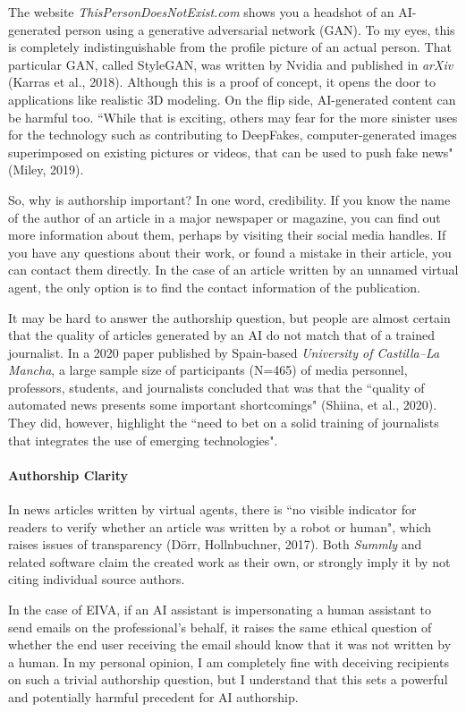 \documentclass{article}
\begin{document}
The website \emph{ThisPersonDoesNotExist.com} shows you a headshot of an AI-generated person using a generative adversarial network (GAN). To my eyes, this is completely indistinguishable from the profile picture of an actual person. That particular GAN, called StyleGAN, was written by Nvidia and published in \emph{arXiv} (Karras et al., 2018). Although this is a proof of concept, it opens the door to applications like realistic 3D modeling. On the flip side, AI-generated content can be harmful too. ``While that is exciting, others may fear for the more sinister uses for the technology such as contributing to DeepFakes, computer-generated images superimposed on existing pictures or videos, that can be used to push fake news" (Miley, 2019).

So, why is authorship important? In one word, credibility. If you know the name of the author of an article in a major newspaper or magazine, you can find out more information about them, perhaps by visiting their social media handles. If you have any questions about their work, or found a mistake in their article, you can contact them directly. In the case of an article written by an unnamed virtual agent, the only option is to find the contact information of the publication.

It may be hard to answer the authorship question, but people are almost certain that the quality of articles generated by an AI do not match that of a trained journalist. In a 2020 paper published by Spain-based \emph{University of Castilla–La Mancha}, a large sample size of participants (N=465) of media personnel, professors, students, and journalists concluded that was that the ``quality of automated news presents some important shortcomings" (Shiina, et al., 2020). They did, however, highlight the ``need to bet on a solid training of journalists that integrates the use of emerging technologies".

\paragraph{Authorship Clarity}

In news articles written by virtual agents, there is ``no visible indicator for readers to verify whether an article was written by a robot or human", which raises issues of transparency (Dörr, Hollnbuchner, 2017). Both \emph{Summly} and related software claim the created work as their own, or strongly imply it by not citing individual source authors.

In the case of EIVA, if an AI assistant is impersonating a human assistant to send emails on the professional's behalf, it raises the same ethical question of whether the end user receiving the email should know that it was not written by a human. In my personal opinion, I am completely fine with deceiving recipients on such a trivial authorship question, but I understand that this sets a powerful and potentially harmful precedent for AI authorship.
\end{document}
